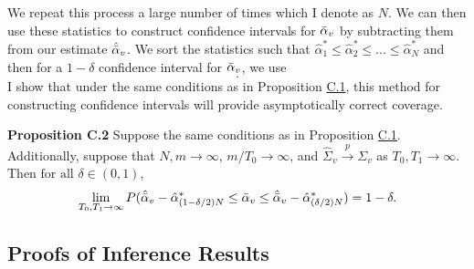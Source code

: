 \documentclass{article}
\begin{document}
We repeat this process a large number of times which I denote as $N$. We can then use these statistics to construct confidence intervals for $\Bar{\alpha}_v$ by subtracting them from our estimate $\hat{\Bar{\alpha}}_v$. We sort the statistics such that $\hat{\alpha}^*_1 \leq \hat{\alpha}^*_2 \leq ... \leq \hat{\alpha}^*_N$
and then for a $1 - \delta$ confidence interval for $\Bar{\alpha}_v$, we use 
\begin{equation*}
    [\hat{\Bar{\alpha}}_v - \hat{\alpha}^*_{(1-\delta/2)N},  \hat{\Bar{\alpha}}_v - \hat{\alpha}^*_{(\delta/2)N}].
\end{equation*}
I show that under the same conditions as in Proposition \hyperref[PC1]{C.1}, this method for constructing confidence intervals will provide asymptotically correct coverage.
\par

\textbf{Proposition C.2}\label{PC2}
Suppose the same conditions as in Proposition \hyperref[PC1]{C.1}. Additionally, suppose that $N,m \rightarrow \infty$, $m/T_0 \rightarrow \infty$, and $\hat{\Sigma}_v \overset{p}{\rightarrow} \Sigma_v$ as $T_0, T_1 \rightarrow \infty$.  
Then $\text{for all } \delta \in (0,1)$,
\begin{equation*}
    \lim_{T_0,T_1 \rightarrow \infty} P(\hat{\Bar{\alpha}}_v - \hat{\alpha}^*_{(1-\delta/2)N} \leq \Bar{\alpha}_v \leq \hat{\Bar{\alpha}}_v - \hat{\alpha}^*_{(\delta/2)N}) = 1 - \delta.
\end{equation*}

\subsection*{Proofs of Inference Results}
\end{document}
